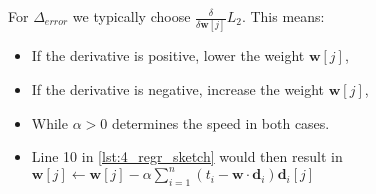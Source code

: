 For $\Delta_{error}$ we typically choose $\frac{\delta}{\delta \mathbf{w}[j]}L_2$. This means:
\begin{itemize}
  \item If the derivative is positive, lower the weight $\mathbf{w}[j]$,
  \item If the derivative is negative, increase the weight $\mathbf{w}[j]$,
  \item While $\alpha>0$ determines the speed in both cases.
  \item Line 10 in \ref{lst:4_regr_sketch} would then result in $\mathbf{w}[j]\leftarrow \mathbf{w}[j] - \alpha \sum_{i=1}^n(t_i-\mathbf{w}\cdot\mathbf{d}_i)\mathbf{d}_i[j]$
\end{itemize}